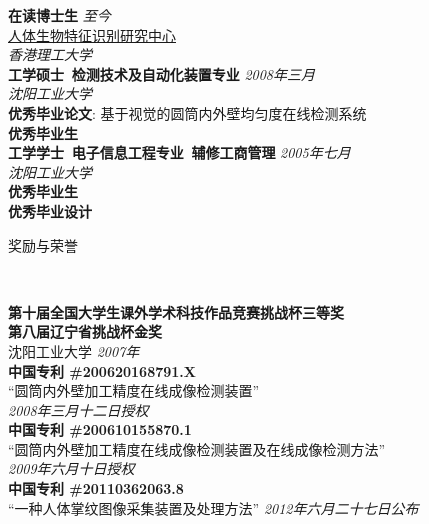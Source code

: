 \documentclass[9pt]{article}
\newenvironment{changemargin}[2]{%
  \begin{list}{}{%
    \setlength{\topsep}{0pt}%
    \setlength{\leftmargin}{#1}%
    \setlength{\rightmargin}{#2}%
    \setlength{\listparindent}{\parindent}%
    \setlength{\itemindent}{\parindent}%
    \setlength{\parsep}{\parskip}%
  }%
  \item[]}{\end{list}
}
\newcommand{\lineover}{
	\begin{changemargin}{-0.05in}{-0.05in}
		\vspace*{-8pt}
		\hrulefill \\
		\vspace*{-2pt}
	\end{changemargin}
}
\newcommand{\header}[1]{
	\begin{changemargin}{-0.5in}{-0.5in}
		\scshape{#1}\\
  	\lineover
	\end{changemargin}
}
\newenvironment{body} {
	\vspace*{-16pt}
	\begin{changemargin}{-0.25in}{-0.5in}
  }	
	{\end{changemargin}
}
\begin{document}
\begin{body}
	\vspace{14pt}
	\textbf{在读博士生}{} \hfill \emph{至今}{} \\
    \href{http://www.comp.polyu.edu.hk/~biometrics/}{人体生物特征识别研究中心}\\    
	\emph{香港理工大学}\\
  \medskip
	\textbf{工学硕士\, 检测技术及自动化装置专业}{} \hfill \emph{2008年三月}{} \\
	\emph{沈阳工业大学}\\
	\textbf{优秀毕业论文}: 基于视觉的圆筒内外壁均匀度在线检测系统\\
    \textbf{优秀毕业生}\\
  \medskip
	\textbf{工学学士\, 电子信息工程专业\, 辅修工商管理} \hfill \emph{2005年七月} \\
    \emph{沈阳工业大学}\\
    \textbf{优秀毕业生}\\
    \textbf{优秀毕业设计}\\
\end{body}

\medskip


\header{奖励与荣誉}

\begin{body}
	\vspace{14pt}	
    \textbf{第十届全国大学生课外学术科技作品竞赛挑战杯三等奖\\
    第八届辽宁省挑战杯金奖}\\
    沈阳工业大学 \hfill{} \emph{2007年}\\
    \medskip
    \textbf{中国专利 \#200620168791.X}\\
    ``圆筒内外壁加工精度在线成像检测装置''\\
    \hfill{} \emph{2008年三月十二日授权}\\
    \medskip	
    \textbf{中国专利 \#200610155870.1}\\
    ``圆筒内外壁加工精度在线成像检测装置及在线成像检测方法''\\
    \hfill{} \emph{2009年六月十日授权}\\
    \medskip    
    \textbf{中国专利 \#20110362063.8}\\
    ``一种人体掌纹图像采集装置及处理方法'' \hfill{} \emph{2012年六月二十七日公布}
\end{body}
\end{document}
